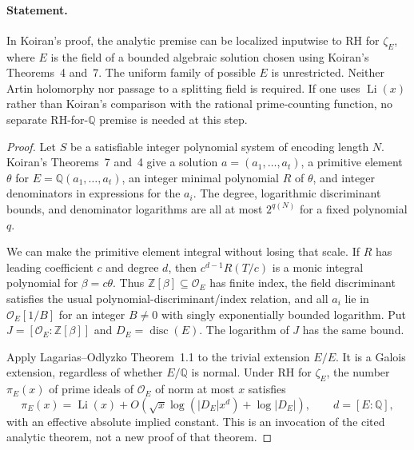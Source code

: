 \paragraph{Statement.}
In Koiran's proof, the analytic premise can be localized inputwise to
RH for $\zeta_E$, where $E$ is the field of a bounded algebraic solution
chosen using Koiran's Theorems~4 and~7. The uniform family of possible
$E$ is unrestricted. Neither Artin holomorphy nor passage to a splitting
field is required. If one uses $\operatorname{Li}(x)$ rather than
Koiran's comparison with the rational prime-counting function, no
separate RH-for-$\mathbb Q$ premise is needed at this step.

\begin{proof}
Let $S$ be a satisfiable integer polynomial system of encoding length
$N$. Koiran's Theorems~7 and~4 give a solution
$a=(a_1,\ldots,a_t)$, a primitive element $\theta$ for
$E=\mathbb Q(a_1,\ldots,a_t)$, an integer minimal polynomial $R$ of
$\theta$, and integer denominators in expressions for the $a_i$.
The degree, logarithmic discriminant bounds, and denominator logarithms
are all at most $2^{q(N)}$ for a fixed polynomial $q$.

We can make the primitive element integral without losing that scale.
If $R$ has leading coefficient $c$ and degree $d$, then
$c^{d-1}R(T/c)$ is a monic integral polynomial for
$\beta=c\theta$. Thus $\mathbb Z[\beta]\subseteq\mathcal O_E$
has finite index, the field discriminant satisfies the usual
polynomial-discriminant/index relation, and all $a_i$ lie in
$\mathcal O_E[1/B]$ for an integer $B\ne0$ with singly exponentially
bounded logarithm. Put $J=[\mathcal O_E:\mathbb Z[\beta]]$ and
$D_E=\operatorname{disc}(E)$. The logarithm of $J$ has the same bound.

Apply Lagarias--Odlyzko Theorem~1.1 to the trivial extension $E/E$.
It is a Galois extension, regardless of whether $E/\mathbb Q$ is
normal. Under RH for $\zeta_E$, the number $\pi_E(x)$ of prime ideals
of $\mathcal O_E$ of norm at most $x$ satisfies
\begin{equation}
 \pi_E(x)=\operatorname{Li}(x)+
 O\!\left(\sqrt{x}\log(|D_E|x^d)+\log |D_E|\right),
 \qquad d=[E:\mathbb Q],
 \label{eq:k01primeideal}
\end{equation}
with an effective absolute implied constant. This is an invocation of
the cited analytic theorem, not a new proof of that theorem.


\end{proof}
